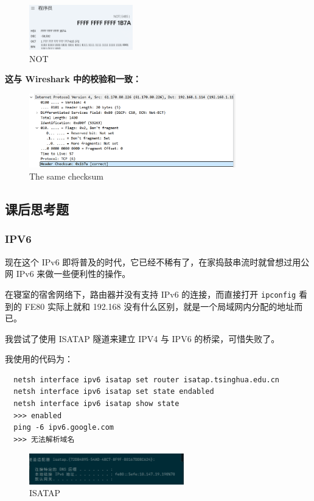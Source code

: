 \documentclass[14pt,a4paper,UTF8,twoside]{article}
\begin{document}
\begin{figure}[H]
  \centering
  \includegraphics[width=0.4\textwidth]{lab3/NOT.png}
  \caption{NOT}
\end{figure}

\textbf{这与 Wireshark 中的校验和一致：}

\begin{figure}[H]
  \centering
  \includegraphics[width=0.8\textwidth]{lab3/check.png}
  \caption{The same checksum}
\end{figure}

\subsection{课后思考题}

\subsubsection{IPV6}

现在这个 IPv6 即将普及的时代，它已经不稀有了，在家捣鼓串流时就曾想过用公网 IPv6 来做一些便利性的操作。

在寝室的宿舍网络下，路由器并没有支持 IPv6 的连接，而直接打开 \texttt{ipconfig} 看到的 FE80 实际上就和 192.168 没有什么区别，就是一个局域网内分配的地址而已。

我尝试了使用 ISATAP 隧道来建立 IPV4 与 IPV6 的桥梁，可惜失败了。

我使用的代码为：

\begin{lstlisting}
  netsh interface ipv6 isatap set router isatap.tsinghua.edu.cn
  netsh interface ipv6 isatap set state endabled
  netsh interface ipv6 isatap show state
  >>> enabled
  ping -6 ipv6.google.com
  >>> 无法解析域名
\end{lstlisting}

\begin{figure}[H]
  \centering
  \includegraphics[width=0.6\textwidth]{lab3/isatap.png}
  \caption{ISATAP}
  \label{fig:isatap}
\end{figure}
\end{document}
